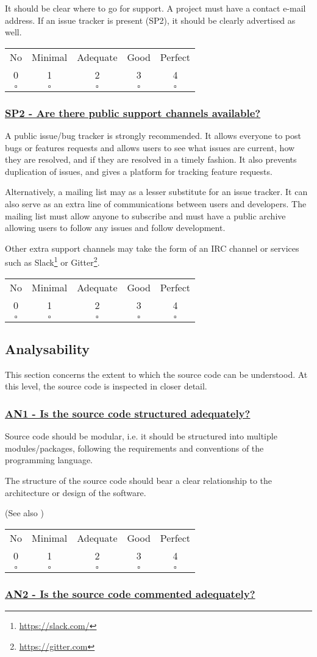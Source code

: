 \documentclass[a4paper,11pt]{article}
\newcommand{\criterion}[2]{\subsubsection*{\underline{#1 - #2}}\label{id:#1}}
\newcommand\CheckTable{%
  \begin{tabular}{ccccc}
    No & Minimal & Adequate & Good & Perfect \\
    0 & 1 & 2 & 3 & 4 \\
    \hline
    $\square$ & $\square$ & $\square$ & $\square$ & $\square$ \\
  \end{tabular}%
}
\newcommand{\refcrit}[1]{%
 \framebox[1.1\width]{\hyperref[id:#1]{#1}}
}
\begin{document}
It should be clear where to go for support. A project must have a contact
e-mail address. If an issue tracker is present (SP2), it should be clearly advertised
as well.

\CheckTable

\newcommand{\spTwoID}{SP2}
\newcommand{\spTwoText}{Are there public support channels available?}
\criterion{\spTwoID}{\spTwoText}

A public issue/bug tracker is strongly recommended. It allows everyone to post
bugs or features requests and allows users to see what issues are current, how
they are resolved, and if they are resolved in a timely fashion. It also
prevents duplication of issues, and gives a platform for
tracking feature requests.

Alternatively, a mailing list may as a lesser substitute for an issue tracker.
It can also serve as an extra line of communications between users
and developers. The mailing list must allow anyone to subscribe and must have a
public archive allowing users to follow any issues and follow development.

Other extra support channels may take the form of an IRC channel or services
such as Slack\footnote{\url{https://slack.com/}} or
Gitter\footnote{\url{https://gitter.com}}.

\CheckTable

\subsection{Analysability}\label{sec:ana}

This section concerns the extent to which the source code can be understood. At
this level, the source code is inspected in closer detail.

\newcommand{\anOneID}{AN1}
\newcommand{\anOneText}{Is the source code structured adequately?}
\criterion{\anOneID}{\anOneText}

Source code should be modular, i.e. it should be structured into multiple
modules/packages, following the requirements and conventions of the programming
language. 

The structure of the source code should bear a clear relationship to the
architecture or design of the software.

(See also \refcrit{R3})

\CheckTable

\newcommand{\anTwoID}{AN2}
\newcommand{\anTwoText}{Is the source code commented adequately?}
\criterion{\anTwoID}{\anTwoText}
\end{document}
